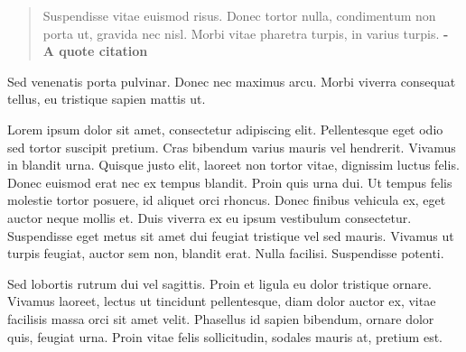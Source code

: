 \documentclass{article}
\begin{document}
\begin{quote}



Suspendisse vitae euismod risus. Donec tortor nulla, condimentum non porta ut, gravida nec nisl. Morbi vitae pharetra turpis, in varius turpis.  \textbf{- A quote citation}


\end{quote}


Sed venenatis porta pulvinar. Donec nec maximus arcu. Morbi viverra consequat tellus, eu tristique sapien mattis ut.


Lorem ipsum dolor sit amet, consectetur adipiscing elit. Pellentesque eget odio sed tortor suscipit pretium. Cras bibendum varius mauris vel hendrerit. Vivamus in blandit urna. Quisque justo elit, laoreet non tortor vitae, dignissim luctus felis. Donec euismod erat nec ex tempus blandit. Proin quis urna dui. Ut tempus felis molestie tortor posuere, id aliquet orci rhoncus. Donec finibus vehicula ex, eget auctor neque mollis et. Duis viverra ex eu ipsum vestibulum consectetur. Suspendisse eget metus sit amet dui feugiat tristique vel sed mauris. Vivamus ut turpis feugiat, auctor sem non, blandit erat. Nulla facilisi. Suspendisse potenti.


Sed lobortis rutrum dui vel sagittis. Proin et ligula eu dolor tristique ornare. Vivamus laoreet, lectus ut tincidunt pellentesque, diam dolor auctor ex, vitae facilisis massa orci sit amet velit. Phasellus id sapien bibendum, ornare dolor quis, feugiat urna. Proin vitae felis sollicitudin, sodales mauris at, pretium est. 


\printbibliography[title={Bibliography}]
\end{document}
